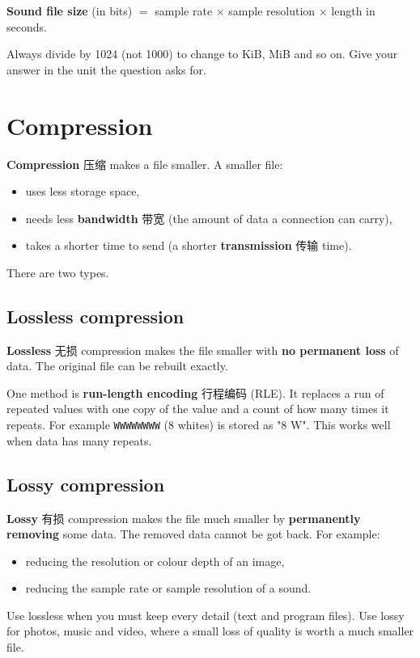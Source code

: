 \documentclass[11pt]{article}
\begin{document}
\textbf{Sound file size} (in bits) $=$ sample rate $\times$ sample resolution $\times$ length in seconds.

Always divide by 1024 (not 1000) to change to KiB, MiB and so on. Give your answer in the unit the question asks for.

\section*{Compression}

\textbf{Compression} 压缩 makes a file smaller. A smaller file:

\begin{itemize}
\item uses less storage space,

\item needs less \textbf{bandwidth} 带宽 (the amount of data a connection can carry),

\item takes a shorter time to send (a shorter \textbf{transmission} 传输 time).

\end{itemize}

There are two types.

\subsection*{Lossless compression}

\textbf{Lossless} 无损 compression makes the file smaller with \textbf{no permanent loss} of data. The original file can be rebuilt exactly.

One method is \textbf{run-length encoding} 行程编码 (RLE). It replaces a run of repeated values with one copy of the value and a count of how many times it repeats. For example \texttt{WWWWWWWW} (8 whites) is stored as "8 W". This works well when data has many repeats.

\subsection*{Lossy compression}

\textbf{Lossy} 有损 compression makes the file much smaller by \textbf{permanently removing} some data. The removed data cannot be got back. For example:

\begin{itemize}
\item reducing the resolution or colour depth of an image,

\item reducing the sample rate or sample resolution of a sound.

\end{itemize}

Use lossless when you must keep every detail (text and program files). Use lossy for photos, music and video, where a small loss of quality is worth a much smaller file.
\end{document}

